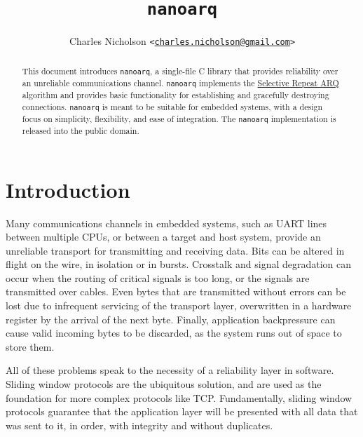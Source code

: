 \documentclass[11pt]{article}
\newcommand{\nanoarq}{\texttt{nanoarq}}
\begin{document}
\title{\nanoarq{}}
\author{Charles Nicholson \texttt{<\href{mailto:charles.nicholson@gmail.com}{charles.nicholson@gmail.com}>}}
\date{}
\maketitle

\begin{abstract}
    This document introduces \nanoarq{}, a single-file C library that provides reliability over an unreliable communications channel. \nanoarq{} implements the \href{https://en.wikipedia.org/wiki/Selective_Repeat_ARQ}{Selective Repeat ARQ}   algorithm and provides basic functionality for establishing and gracefully destroying connections. \nanoarq{} is meant to be suitable for embedded systems, with a design focus on simplicity, flexibility, and ease of integration. The \nanoarq{} implementation is released into the public domain.
\end{abstract}

\begin{spacing}{0.0}
\tableofcontents
\end{spacing}

\section{Introduction}
Many communications channels in embedded systems, such as UART lines between multiple CPUs, or between a target and host system, provide an unreliable transport for transmitting and receiving data. Bits can be altered in flight on the wire, in isolation or in bursts. Crosstalk and signal degradation can occur when the routing of critical signals is too long, or the signals are transmitted over cables. Even bytes that are transmitted without errors can be lost due to infrequent servicing of the transport layer, overwritten in a hardware register by the arrival of the next byte. Finally, application backpressure can cause valid incoming bytes to be discarded, as the system runs out of space to store them. \par

All of these problems speak to the necessity of a reliability layer in software. Sliding window protocols are the ubiquitous solution, and are used as the foundation for more complex protocols like TCP. Fundamentally, sliding window protocols guarantee that the application layer will be presented with all data that was sent to it, in order, with integrity and without duplicates. \par
\end{document}
